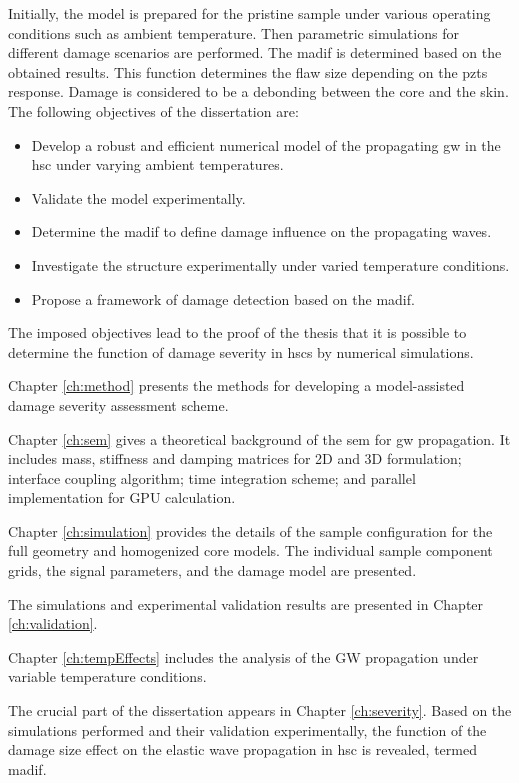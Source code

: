 \documentclass[11pt,a4paper,final]{report}
\begin{document}
Initially, the model is prepared for the pristine sample under various operating conditions such as ambient temperature.
Then parametric simulations for different damage scenarios are performed.
The \ac{madif} is determined based on the obtained results. 
This function determines the flaw size depending on the \acp{pzt} response.
Damage is considered to be a debonding between the core and the skin. 
The following objectives of the dissertation are:
\begin{itemize}
	\item Develop a robust and efficient numerical model of the propagating \ac{gw} in the \ac{hsc} under varying ambient temperatures.
	\item Validate the model experimentally.
	\item Determine the \ac{madif} to define damage influence on the propagating waves.
	\item Investigate the structure experimentally under varied temperature conditions.
	\item Propose a framework of damage detection based on the \ac{madif}.
\end{itemize}

The imposed objectives lead to the proof of the thesis that it is possible to determine the function of damage severity in \acp{hsc} by numerical simulations.

Chapter \ref{ch:method} presents the methods for developing a model-assisted damage severity assessment scheme.

Chapter \ref{ch:sem} gives a theoretical background of the \ac{sem} for \ac{gw} propagation.
It includes mass, stiffness and damping matrices for 2D and 3D formulation; interface coupling algorithm; time integration scheme; and parallel implementation for GPU calculation.

Chapter \ref{ch:simulation} provides the details of the sample configuration for the full geometry and homogenized core models. The individual sample component grids, the signal parameters, and the damage model are presented.

The simulations and experimental validation results are presented in Chapter \ref{ch:validation}.

Chapter \ref{ch:tempEffects} includes the analysis of the GW propagation under variable temperature conditions.

The crucial part of the dissertation appears in Chapter \ref{ch:severity}. Based on the simulations performed and their validation experimentally, the function of the damage size effect on the elastic wave propagation in \ac{hsc} is revealed, termed \ac{madif}.
\end{document}
